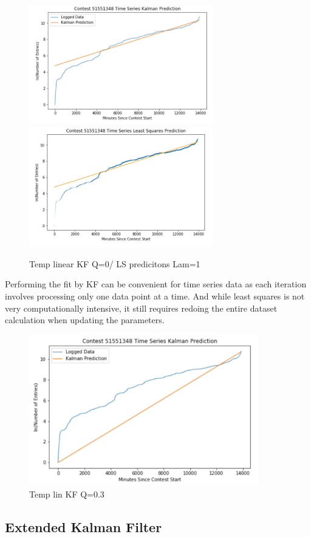 \begin{figure}[h]
\centering
\includegraphics[width=8cm]{body/methodology/KF_Q0.png}
\includegraphics[width=8cm]{body/methodology/LS_pred.png}
\caption{Temp linear KF Q=0/ LS predicitons Lam=1}
\end{figure}

Performing the fit by KF can be convenient for time series data as each iteration involves processing only one data point at a time. And while least squares is not very computationally intensive, it still requires redoing the entire dataset calculation when updating the parameters.

\begin{figure}[h]
\centering
\includegraphics[width=10cm]{body/methodology/KF_Q3.png}
\caption{Temp lin KF Q=0.3}
\end{figure}

\subsection{Extended Kalman Filter}

